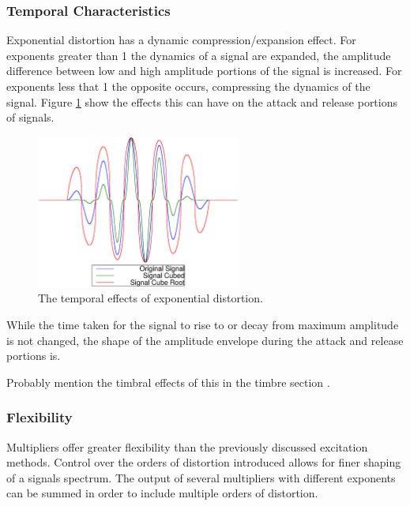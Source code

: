		\subsubsection*{Temporal Characteristics}
			Exponential distortion has a dynamic compression/expansion effect. For exponents greater than 1 the
			dynamics of a signal are expanded, the amplitude difference between low and high amplitude portions
			of the signal is increased. For exponents less that 1 the opposite occurs, compressing the dynamics
			of the signal. Figure \ref{fig:ExponentiationTemporalEffects} show the effects this can have on the
			attack and release portions of signals.

			\begin{figure}[h!]
				\centering
				\includegraphics[width=0.6\textwidth]{chapter3/Images/ExponentiationTemporalEffects.eps}
				\caption{The temporal effects of exponential distortion.}
				\label{fig:ExponentiationTemporalEffects}
			\end{figure}

			While the time taken for the signal to rise to or decay from maximum amplitude is not changed, the
			shape of the amplitude envelope during the attack and release portions is. 

			\note
			{ 
				Probably mention the timbral effects of this in the timbre section
				\citep{patterson1994the}.
			}

		\subsubsection*{Flexibility}
			Multipliers offer greater flexibility than the previously discussed excitation methods. Control
			over the orders of distortion introduced allows for finer shaping of a signals spectrum. The output
			of several multipliers with different exponents can be summed in order to include multiple orders
			of distortion.

